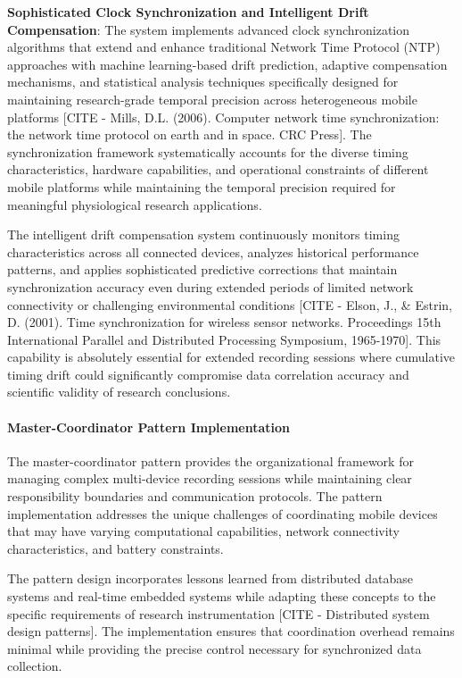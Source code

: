 \documentclass[12pt,a4paper]{article}
\begin{document}
\textbf{Sophisticated Clock Synchronization and Intelligent Drift Compensation}: The system implements advanced clock
synchronization algorithms that extend and enhance traditional Network Time Protocol (NTP) approaches with machine
learning-based drift prediction, adaptive compensation mechanisms, and statistical analysis techniques specifically
designed for maintaining research-grade temporal precision across heterogeneous mobile
platforms [CITE - Mills, D.L. (2006). Computer network time synchronization: the network time protocol on earth and in space. CRC Press].
The synchronization framework systematically accounts for the diverse timing characteristics, hardware capabilities, and
operational constraints of different mobile platforms while maintaining the temporal precision required for meaningful
physiological research applications.

The intelligent drift compensation system continuously monitors timing characteristics across all connected devices,
analyzes historical performance patterns, and applies sophisticated predictive corrections that maintain synchronization
accuracy even during extended periods of limited network connectivity or challenging environmental
conditions [CITE - Elson, J., \& Estrin, D. (2001). Time synchronization for wireless sensor networks. Proceedings 15th International Parallel and Distributed Processing Symposium, 1965-1970].
This capability is absolutely essential for extended recording sessions where cumulative timing drift could
significantly compromise data correlation accuracy and scientific validity of research conclusions.

\paragraph{Master-Coordinator Pattern Implementation}

The master-coordinator pattern provides the organizational framework for managing complex multi-device recording
sessions while maintaining clear responsibility boundaries and communication protocols. The pattern implementation
addresses the unique challenges of coordinating mobile devices that may have varying computational capabilities, network
connectivity characteristics, and battery constraints.

The pattern design incorporates lessons learned from distributed database systems and real-time embedded systems while
adapting these concepts to the specific requirements of research
instrumentation [CITE - Distributed system design patterns]. The implementation ensures that coordination overhead
remains minimal while providing the precise control necessary for synchronized data collection.
\end{document}
